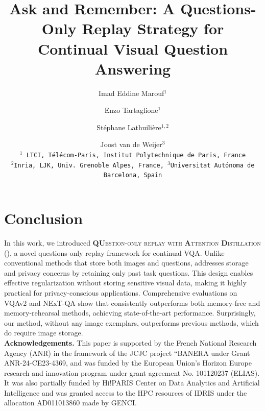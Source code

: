\documentclass[10pt,twocolumn,letterpaper]{article}
\title{Ask and Remember: A Questions-Only Replay Strategy for Continual Visual Question Answering}
\author{
Imad Eddine Marouf$^{1}$
\and
Enzo Tartaglione$^{1}$
\and 
Stéphane Lathuilière$^{1,2}$
\and 
Joost van de Weijer$^{3}$ \\
{\tt\small $^{1}$ LTCI, Télécom-Paris, Institut Polytechnique de Paris, France}\\{\tt\small $^{2}$Inria, LJK,  Univ.~Grenoble Alpes, France, $^{3}$Universitat Autónoma de Barcelona, Spain} %
}
\begin{document}
\maketitle
    




\section{Conclusion}
\label{sec:conclusion}
In this work, we introduced \textsc{\textbf{QU}estion-only replay with \textbf{A}ttention \textbf{D}istillation} (\qstmethodshort{}), a novel questions-only replay framework for continual VQA. Unlike conventional methods that store both images and questions, \qstmethodshort{} addresses storage and privacy concerns by retaining only past task questions. This design enables effective regularization without storing sensitive visual data, making it highly practical for privacy-conscious applications. Comprehensive evaluations on VQAv2 and NExT-QA show that \qstmethodshort{} consistently outperforms both memory-free and memory-rehearsal methods, achieving state-of-the-art performance.  Surprisingly, our method, without any image exemplars, outperforms previous methods, which do require image storage. \\
\textbf{Acknowledgements. }This paper is supported by the French National Research Agency (ANR) in the framework of the JCJC project “BANERA under Grant ANR-24-CE23-4369, and was funded by the European Union's Horizon Europe research and innovation program under grant agreement No. 101120237 (ELIAS). It was also partially funded by Hi!PARIS Center on Data Analytics and Artificial Intelligence and was granted access to the HPC resources of IDRIS under the allocation AD011013860 made by GENCI.
{
    \small
    
    
}

\end{document}
